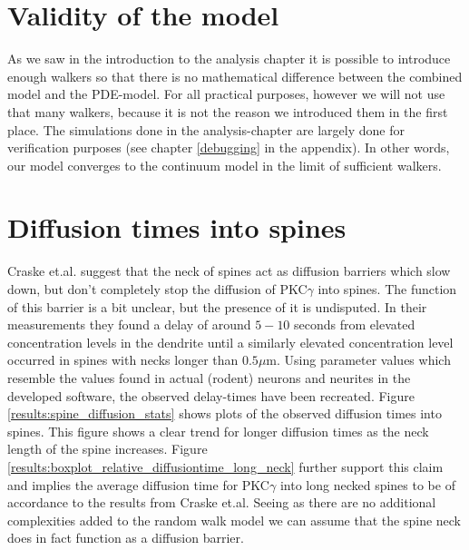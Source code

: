 \documentclass[main.tex]{subfiles}
\begin{document}
 

\section{Validity of the model}
As we saw in the introduction to the analysis chapter it is possible to introduce enough walkers so that there is no mathematical difference between the combined model and the PDE-model. 
For all practical purposes, however we will not use that many walkers, because it is not the reason we introduced them in the first place. 
The simulations done in the analysis-chapter are largely done for verification purposes (see chapter \ref{debugging} in the appendix).
In other words, our model converges to the continuum model in the limit of sufficient walkers.


\section{Diffusion times into spines}

Craske et.al. suggest that the neck of spines act as diffusion barriers which slow down, but don't completely stop the diffusion of PKC$\gamma$ into spines. 
The function of this barrier is a bit unclear, but the presence of it is undisputed. 
In their measurements they found a delay of around $5-10$ seconds from elevated concentration levels in the dendrite until a similarly elevated concentration level occurred in spines with necks longer than $0.5\mu$m. 
Using parameter values which resemble the values found in actual (rodent) neurons and neurites in the developed software, the observed delay-times have been recreated. 
Figure \ref{results:spine_diffusion_stats} shows plots of the observed diffusion times into spines. 
This figure shows a clear trend for longer diffusion times as the neck length of the spine increases. 
Figure \ref{results:boxplot_relative_diffusiontime_long_neck} further support this claim and implies the average diffusion time for PKC$\gamma$ into long necked spines to be of accordance to the results from Craske et.al.
Seeing as there are no additional complexities added to the random walk model we can assume that the spine neck does in fact function as a diffusion barrier.
\end{document}
